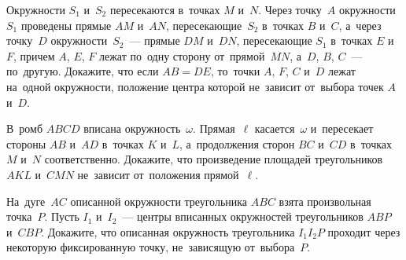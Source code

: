 \begin{problems}
\item
Окружности $S_{1}$ и~$S_{2}$ пересекаются в~точках $M$ и~$N$.
Через точку~$A$ окружности~$S_{1}$ проведены прямые $AM$ и~$AN$,
пересекающие~$S_{2}$ в~точках $B$ и~$C$, а~через точку~$D$
окружности~$S_{2}$~--- прямые $DM$ и~$DN$, пересекающие $S_{1}$
в~точках $E$ и~$F$, причем $A$, $E$, $F$ лежат по~одну сторону от~прямой~$MN$,
а~$D$, $B$, $C$~--- по~другую.
Докажите, что если $AB = DE$, то~точки $A$, $F$, $C$ и~$D$ лежат на~одной
окружности, положение центра которой не~зависит от~выбора точек $A$ и~$D$.

\item
В~ромб $ABCD$ вписана окружность~$\omega$.
Прямая~$\ell$ касается~$\omega$ и~пересекает стороны $AB$ и~$AD$
в~точках $K$ и~$L$, а~продолжения сторон $BC$ и~$CD$ в~точках $M$ и~$N$
соответственно.
Докажите, что произведение площадей треугольников $AKL$ и~$CMN$ не~зависит
от~положения прямой~$\ell$.

\item
На~дуге~$AC$ описанной окружности треугольника $ABC$ взята произвольная
точка~$P$.
Пусть $I_1$ и~$I_2$~--- центры вписанных окружностей
треугольников $ABP$ и~$CBP$.
Докажите, что описанная окружность треугольника $I_1 I_2 P$ проходит через
некоторую фиксированную точку, не~зависящую от~выбора~$P$.

\end{problems}

